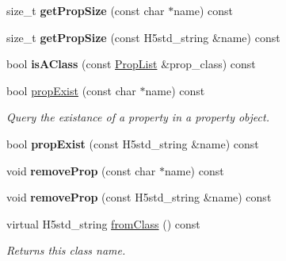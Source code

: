 \begin{DoxyCompactItemize}
size\+\_\+t {\bfseries get\+Prop\+Size} (const char $\ast$name) const
\item 
\mbox{\label{class_h5_1_1_prop_list_a5f424f1d19830fd7449827414ccf7580}} 
size\+\_\+t {\bfseries get\+Prop\+Size} (const H5std\+\_\+string \&name) const
\item 
\mbox{\label{class_h5_1_1_prop_list_a37f2a0f4ae4d8e9a4b8ccb1df3930b4b}} 
bool {\bfseries is\+A\+Class} (const \hyperlink{class_h5_1_1_prop_list}{Prop\+List} \&prop\+\_\+class) const
\item 
\mbox{\label{class_h5_1_1_prop_list_ada762c40ae01214c7f4fb283b3451b11}} 
bool \hyperlink{class_h5_1_1_prop_list_ada762c40ae01214c7f4fb283b3451b11}{prop\+Exist} (const char $\ast$name) const
\begin{DoxyCompactList}\small\item\em Query the existance of a property in a property object. \end{DoxyCompactList}\item 
\mbox{\label{class_h5_1_1_prop_list_afafa6a7bbfb8197b061c9ccc4ed20ecd}} 
bool {\bfseries prop\+Exist} (const H5std\+\_\+string \&name) const
\item 
\mbox{\label{class_h5_1_1_prop_list_a8fcfd914b3b1d2dddfe58043c41c20d6}} 
void {\bfseries remove\+Prop} (const char $\ast$name) const
\item 
\mbox{\label{class_h5_1_1_prop_list_ad4673c105a4a0963efcbb79818b051f5}} 
void {\bfseries remove\+Prop} (const H5std\+\_\+string \&name) const
\item 
\mbox{\label{class_h5_1_1_prop_list_a090ada6d21725f711f017b5457383077}} 
virtual H5std\+\_\+string \hyperlink{class_h5_1_1_prop_list_a090ada6d21725f711f017b5457383077}{from\+Class} () const
\begin{DoxyCompactList}\small\item\em Returns this class name. \end{DoxyCompactList}\item 
\mbox{\label{class_h5_1_1_prop_list_a8f3198e63cf76ac921c7aff75256f6a7}} 

\end{DoxyCompactItemize}
